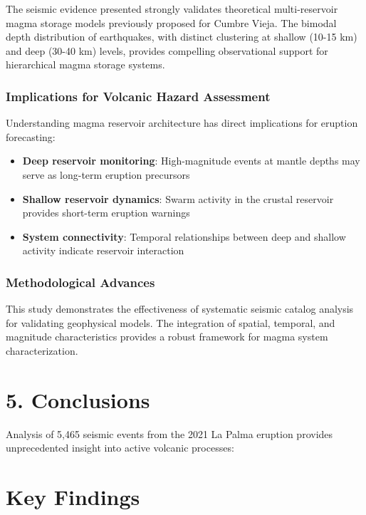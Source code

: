 \documentclass[
  letterpaper,
]{book}
\providecommand{\tightlist}{%
  \setlength{\itemsep}{0pt}\setlength{\parskip}{0pt}}
\begin{document}
The seismic evidence presented strongly validates theoretical
multi-reservoir magma storage models previously proposed for Cumbre
Vieja. The bimodal depth distribution of earthquakes, with distinct
clustering at shallow (10-15 km) and deep (30-40 km) levels, provides
compelling observational support for hierarchical magma storage systems.

\subsection{Implications for Volcanic Hazard
Assessment}\label{implications-for-volcanic-hazard-assessment}

Understanding magma reservoir architecture has direct implications for
eruption forecasting:

\begin{itemize}
\tightlist
\item
  \textbf{Deep reservoir monitoring}: High-magnitude events at mantle
  depths may serve as long-term eruption precursors
\item
  \textbf{Shallow reservoir dynamics}: Swarm activity in the crustal
  reservoir provides short-term eruption warnings
\item
  \textbf{System connectivity}: Temporal relationships between deep and
  shallow activity indicate reservoir interaction
\end{itemize}

\subsection{Methodological Advances}\label{methodological-advances}

This study demonstrates the effectiveness of systematic seismic catalog
analysis for validating geophysical models. The integration of spatial,
temporal, and magnitude characteristics provides a robust framework for
magma system characterization.


\chapter{5. Conclusions}\label{conclusions}

Analysis of 5,465 seismic events from the 2021 La Palma eruption
provides unprecedented insight into active volcanic processes:


\chapter{Key Findings}\label{key-findings}
\end{document}
